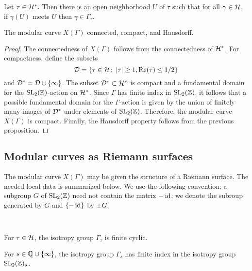\begin{cor} \label{pr:chart-nhood}
 Let $\tau\in\mathcal{H}^*.$ Then there is an open neighborhood $U$ of $\tau$ such that for all $\gamma\in\mathcal{H}$, if $\gamma(U)$ meets $U$ then $\gamma\in\Gamma_\tau$.
\end{cor}

\begin{prop}
 The modular curve $X(\Gamma)$ connected, compact, and Hausdorff.
\end{prop}

\begin{proof}
 The connectedness of $X(\Gamma)$ follows from the connectedness of $\mathcal{H}^*$. For compactness, define the subsets
 \[\mathcal{D}=\{\tau\in\mathcal{H}\,;\; |\tau|\geq 1, \operatorname{Re}(\tau)\leq 1/2\}\] and $\mathcal{D}^*=\mathcal{D}\cup\{\infty\}$. The subset $\mathcal{D}^*\subset\mathcal{H}^*$ is compact and a fundamental domain for the $\operatorname{SL}_2(\mathbb{Z})$-action on $\mathcal{H}^*$. Since $\Gamma$ has finite index in $\operatorname{SL}_2(\mathbb{Z})$, it follows that a possible fundamental domain for the $\Gamma$-action is given by the union of finitely many images of $\mathcal{D}^*$ under elements of $\operatorname{SL}_2(\mathbb{Z})$. Therefore, the modular curve $X(\Gamma)$ is compact. Finally, the Hausdorff property follows from the previous proposition. 
\end{proof}

\subsection{Modular curves as Riemann surfaces}

The modular curve $X(\Gamma)$ may be given the structure of a Riemann surface. The needed local data is summarized below. We use the following convention: a subgroup $G$ of $\operatorname{SL}_2(\mathbb{Z})$ need not contain the matrix $-\operatorname{id}$; we denote the subroup generated by $G$ and $\{-\operatorname{id}\}$ by $\pm G$.

\begin{prop} \ 

  For $\tau\in\mathcal{H}$, the isotropy group $\Gamma_\tau$ is finite cyclic.
 
  For $s\in\mathbb{Q}\cup\{\infty\}$, the isotropy group $\Gamma_s$ has finite index in the isotropy group $\operatorname{SL}_2(\mathbb{Z})_s$.
\end{prop}

